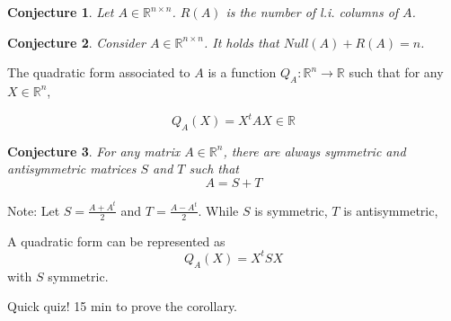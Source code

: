 \documentclass[aspectratio=169]{beamer}
\newtheorem{proposition}{Conjecture}[section]
\begin{document}
\begin{frame}
    \begin{proposition}
        Let $A\in\mathbb{R}^{n\times n}$. $R(A)$ is the number of l.i. columns of $A$.
    \end{proposition}
    
    \begin{proposition}
        Consider $A\in\mathbb{R}^{n\times n}$. It holds that $Null(A)+R(A)=n$.
    \end{proposition}
\end{frame}

\begin{frame}
    \begin{definition}
        The quadratic form associated to $A$ is a function $Q_A:\mathbb{R}^n\rightarrow\mathbb{R}$ such that for any $X\in\mathbb{R}^n$,
        
        $$Q_A(X)=X^tAX\in\mathbb{R}$$
    \end{definition}
\end{frame}

\begin{frame}

\begin{proposition}
    For any matrix $A\in\mathbb{R}^n$, there are always symmetric and antisymmetric matrices $S$ and $T$ such that $$A=S+T$$
\end{proposition}

Note:  Let $S=\frac{A+A^t}{2}$ and $T=\frac{A-A^t}{2}$. While $S$ is symmetric, $T$ is antisymmetric,
    
    
    \begin{corollary}
        A quadratic form can be represented as $$Q_A(X)=X^t S X$$ with $S$ symmetric.
    \end{corollary}
\end{frame}

\begin{frame}
    Quick quiz! 15 min to prove the corollary.
\end{frame}
\end{document}
